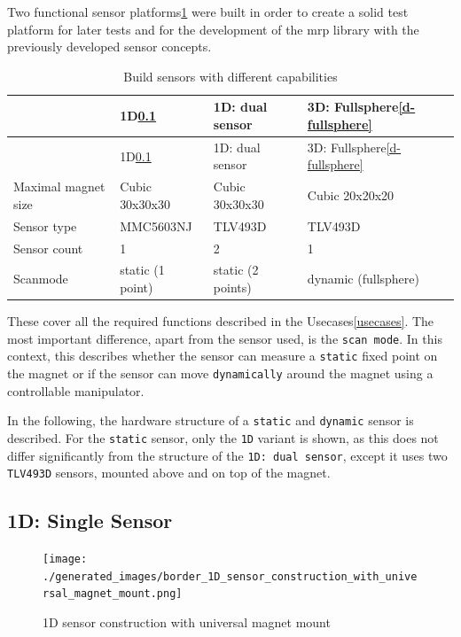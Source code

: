 Two functional sensor
platforms\ref{Build_sensors_with_different_capabilities.csv} were built
in order to create a solid test platform for later tests and for the
development of the \gls{mrp} library with the previously developed
sensor concepts.

\begin{longtable}[]{@{}llll@{}}
\caption{Build sensors with different capabilities
\label{Build_sensors_with_different_capabilities.csv}}\tabularnewline
\toprule
& 1D\ref{d-single-sensor} & 1D: dual sensor & 3D:
Fullsphere\ref{d-fullsphere}\tabularnewline
\midrule
\endfirsthead
\toprule
& 1D\ref{d-single-sensor} & 1D: dual sensor & 3D:
Fullsphere\ref{d-fullsphere}\tabularnewline
\midrule
\endhead
Maximal magnet size & Cubic 30x30x30 & Cubic 30x30x30 & Cubic
20x20x20\tabularnewline
Sensor type & MMC5603NJ & TLV493D & TLV493D\tabularnewline
Sensor count & 1 & 2 & 1\tabularnewline
Scanmode & static (1 point) & static (2 points) & dynamic
(fullsphere)\tabularnewline
\bottomrule
\end{longtable}

These cover all the required functions described in the
Usecases\ref{usecases}. The most important difference, apart from the
sensor used, is the \passthrough{\lstinline!scan mode!}. In this
context, this describes whether the sensor can measure a
\passthrough{\lstinline!static!} fixed point on the magnet or if the
sensor can move \passthrough{\lstinline!dynamically!} around the magnet
using a controllable manipulator.

In the following, the hardware structure of a
\passthrough{\lstinline!static!} and \passthrough{\lstinline!dynamic!}
sensor is described. For the \passthrough{\lstinline!static!} sensor,
only the \passthrough{\lstinline!1D!} variant is shown, as this does not
differ significantly from the structure of the
\passthrough{\lstinline!1D: dual sensor!}, except it uses two
\passthrough{\lstinline!TLV493D!} sensors, mounted above and on top of
the magnet.

\hypertarget{d-single-sensor}{%
\subsection{1D: Single Sensor}\label{d-single-sensor}}

\begin{figure}
\centering
\texttt{[image: ./generated\_images/border\_1D\_sensor\_construction\_with\_universal\_magnet\_mount.png]}
\caption{1D sensor construction with universal magnet mount
\label{1D_sensor_construction_with_universal_magnet_mount.png}}
\end{figure}

